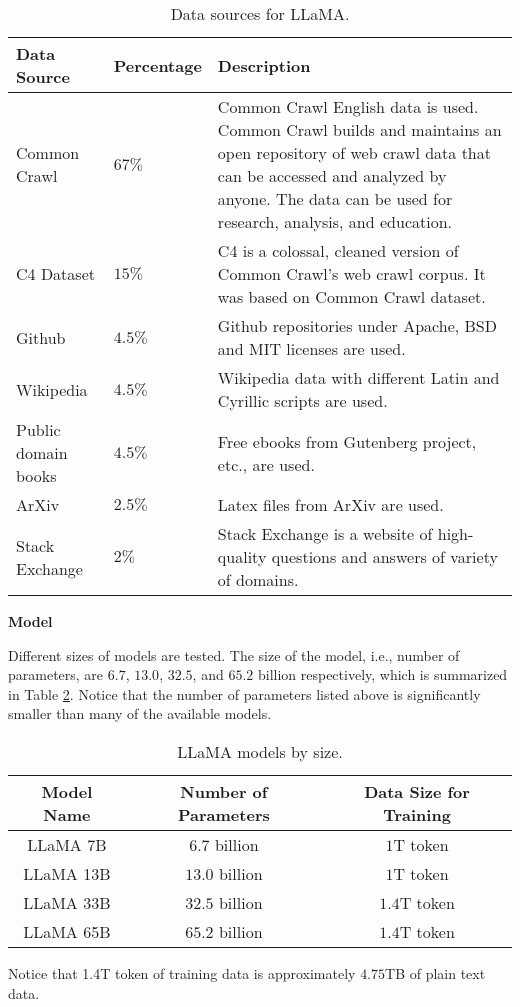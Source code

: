 \begin{table}[htbp]
	\centering
	\caption{Data sources for LLaMA.} \label{tab:llama:data_sources}
	\begin{tabularx}{\textwidth}{|l|l|X|}
		\hline
		Data Source & Percentage & Description \\ \hline
		Common Crawl & $67\%$ & Common Crawl English data is used. Common Crawl builds and maintains an open repository of web crawl data that can be accessed and analyzed by anyone. The data can be used for research, analysis, and education. \\ \hline
		C4 Dataset & $15\%$ & C4 is a colossal, cleaned version of Common Crawl's web crawl corpus. It was based on Common Crawl dataset. \\ \hline
		Github & $4.5\%$ & Github repositories under Apache, BSD and MIT licenses are used. \\ \hline
		Wikipedia & $4.5\%$ & Wikipedia data with different Latin and Cyrillic scripts are used. \\ \hline
		Public domain books & $4.5\%$ & Free ebooks from Gutenberg project, etc., are used. \\ \hline
		ArXiv & $2.5\%$ & Latex files from ArXiv are used. \\ \hline
		Stack Exchange & $2\%$ & Stack Exchange is a website of high-quality questions and answers of variety of domains. \\
		\hline
	\end{tabularx}
\end{table}

\vspace{0.1in}
\noindent \textbf{Model}
\vspace{0.1in}

Different sizes of models are tested. The size of the model, i.e., number of parameters, are $6.7$, $13.0$, $32.5$, and $65.2$ billion respectively, which is summarized in Table \ref{tab:llama:models}. Notice that the number of parameters listed above is significantly smaller than many of the available models.

\begin{table}[htbp]
	\centering
	\caption{LLaMA models by size.} \label{tab:llama:models}
	\begin{tabular}{|c|c|c|}
		\hline
		Model Name & Number of Parameters & Data Size for Training \\ \hline
        LLaMA 7B & $6.7$ billion & $1$T token \\ \hline
        LLaMA 13B & $13.0$ billion & $1$T token \\ \hline
        LLaMA 33B & $32.5$ billion & $1.4$T token \\ \hline
        LLaMA 65B & $65.2$ billion & $1.4$T token \\ \hline
	\end{tabular}
\begin{flushleft}
  Notice that 1.4T token of training data is approximately $4.75$TB of plain text data.
\end{flushleft}
\end{table}

